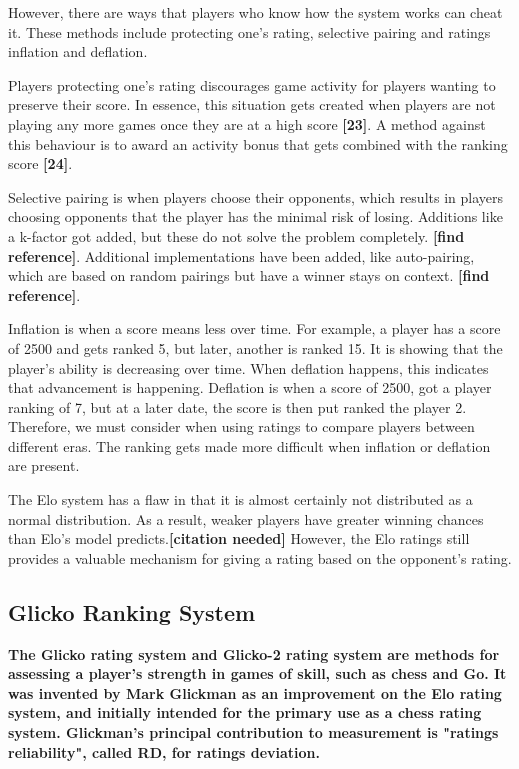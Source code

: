 	However, there are ways that players who know how the system works can cheat it. These methods include protecting one's rating, selective pairing and ratings inflation and deflation.
	
	Players protecting one's rating discourages game activity for players wanting to preserve their score. In essence, this situation gets created when players are not playing any more games once they are at a high score \textbf{[23]}.  A method against this behaviour is to award an activity bonus that gets combined with the ranking score \textbf{[24]}.
	
	Selective pairing is when players choose their opponents, which results in players choosing opponents that the player has the minimal risk of losing. Additions like a k-factor got added, but these do not solve the problem completely. \textbf{[find reference]}. Additional implementations have been added, like auto-pairing, which are based on random pairings but have a winner stays on context.\textbf{ [find reference]}.
	
	Inflation is when a score means less over time. For example, a player has a score of 2500 and gets ranked 5, but later, another is ranked 15. It is showing that the player's ability is decreasing over time. When deflation happens, this indicates that advancement is happening. Deflation is when a score of 2500, got a player ranking of 7, but at a later date, the score is then put ranked the player 2. Therefore, we must consider when using ratings to compare players between different eras. The ranking gets made more difficult when inflation or deflation are present. %

	The Elo system has a flaw in that it is almost certainly not distributed as a normal distribution. As a result, weaker players have greater winning chances than Elo's model predicts.\textbf{[citation needed]} However, the Elo ratings still provides a valuable mechanism for giving a rating based on the opponent's rating.
	
	\subsection{Glicko Ranking System}
	\textbf{The Glicko rating system and Glicko-2 rating system are methods for assessing a player's strength in games of skill, such as chess and Go. It was invented by Mark Glickman as an improvement on the Elo rating system, and initially intended for the primary use as a chess rating system. Glickman's principal contribution to measurement is "ratings reliability", called RD, for ratings deviation.}
	
